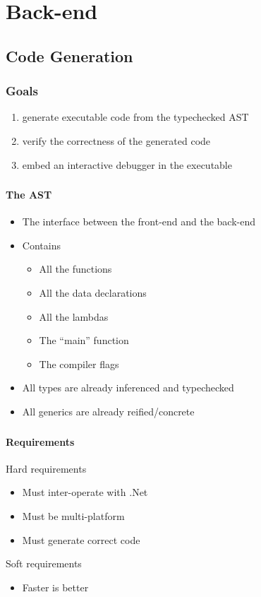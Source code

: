 \section{Back-end}

\subsection{Code Generation}

\begin{frame}
    \frametitle{Goals}
    \begin{enumerate}
    \item generate executable code from the typechecked AST
    \item verify the correctness of the generated code 
    \item embed an interactive debugger in the executable
    \end{enumerate}
\end{frame}

\begin{frame}
    \frametitle{\subsecname}
    \framesubtitle{The AST}
    \begin{itemize}
    \item The interface between the front-end and the back-end
    \item Contains
        \begin{itemize}
        \item All the functions
        \item All the data declarations
        \item All the lambdas
        \item The “main” function
        \item The compiler flags
        \end{itemize}
    \item All types are already inferenced and typechecked
    \item All generics are already reified/concrete
    \end{itemize}
\end{frame}


\begin{frame}
    \frametitle{\subsecname}
    \framesubtitle{Requirements}
    Hard requirements
    \begin{itemize}
    \item Must inter-operate with .Net
    \item Must be multi-platform
    \item Must generate correct code
    \end{itemize}
    Soft requirements
    \begin{itemize}
    \item Faster is better
    \end{itemize}
\end{frame}

